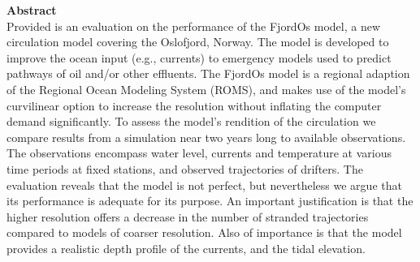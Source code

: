 {\bf \sffamily Abstract}                                          \\
\small{Provided is an evaluation on the performance of the FjordOs model, a new circulation model covering the Oslofjord, Norway. The model is developed to improve the ocean input (e.g., currents) to emergency models used to predict pathways of oil and/or other effluents. The FjordOs model is a regional adaption of the Regional Ocean Modeling System (ROMS), and makes use of the model's curvilinear option to increase the resolution without inflating the computer demand significantly. To assess the model's rendition of the circulation we compare results from a simulation near two years long to available observations. The observations encompass water level, currents and temperature at various time periods at fixed stations, and observed trajectories of drifters. The evaluation reveals that the model is not perfect, but nevertheless we argue that its performance is adequate for its purpose. An important justification is that the higher resolution offers a decrease in the number of stranded trajectories compared to models of coarser resolution. Also of importance is that the model provides a realistic depth profile of the currents, and the tidal elevation.}



